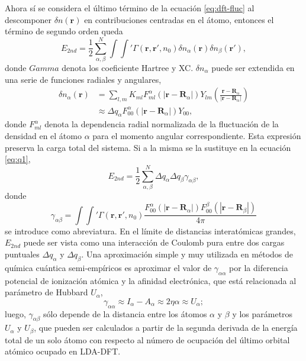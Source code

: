 \begin{enumerate}
        Ahora sí se considera el último término de la ecuación \ref{eq:dft-fluc}
        al descomponer $\delta n(\mathbf{r})$ en contribuciones centradas en el
        átomo, entonces el término de segundo orden queda
        \begin{equation}\label{eq:q1}
        E_{2nd} = \frac{1}{2} \sum_{\alpha, \beta}^N \int \int' \Gamma(\mathbf{r}, \mathbf{r}', n_0) \delta n_{\alpha}(\mathbf{r}) \delta n_{\beta}(\mathbf{r}'),
        \end{equation}
        donde $Gamma$ denota los coeficiente Hartree y XC. $\delta n_{\alpha}$
        puede ser extendida en una serie de funciones radiales y angulares,
        \begin{equation*}
            \begin{aligned}
                \delta n_{\alpha}(\mathbf{r}) &= \sum_{l,m} K_{ml} F_{ml}^{\alpha}(|\mathbf{r} - \mathbf{R}_{\alpha}|) Y_{lm} \left(\frac{\mathbf{r}-\mathbf{R}_{\alpha}}{|\mathbf{r}-\mathbf{R}_{\alpha}|}\right) \\
                &\approx \Delta q_{\alpha} F_{00}^{\alpha}(|\mathbf{r} - \mathbf{R}_{\alpha}|) Y_{00},
            \end{aligned}
        \end{equation*}
        donde $F_{ml}^{\alpha}$ denota la dependencia radial normalizada de la
        fluctuación de la densidad en el átomo $\alpha$ para el momento angular
        correspondiente. Esta expresión preserva la carga total del sistema.
        Si a la misma se la sustituye en la ecuación \ref{eq:q1},
        $$
        E_{2nd} = \frac{1}{2} \sum_{\alpha,\beta}^N \Delta q_{\alpha} \Delta q_{\beta} \gamma_{\alpha\beta},
        $$
        donde
        $$
        \gamma_{\alpha\beta} = \int \int' \Gamma(\mathbf{r},\mathbf{r}',n_0)\frac{F_{00}^{\alpha}(|\mathbf{r} - \mathbf{R}_{\alpha}|)F_{00}^{\beta}(|\mathbf{r} - \mathbf{R}_{\beta}|)}{4 \pi}
        $$
        se introduce como abreviatura. En el límite de distancias interatómicas
        grandes, $E_{2nd}$ puede ser vista como una interacción de Coulomb pura
        entre dos cargas puntuales $\Delta q_{\alpha}$ y $\Delta q_{\beta}$. Una
        aproximación simple y muy utilizada en métodos de química cuántica 
        semi-empíricos es aproximar el valor de $\gamma_{\alpha\alpha}$ por la 
        diferencia potencial de ionización atómica y la afinidad electrónica, que
        está relacionada al parámetro de Hubbard $U_{\alpha}$,
        $$
        \gamma_{\alpha\alpha} \approx I_{\alpha} - A_{\alpha} \approx 2 \eta \alpha \approx U_{\alpha};
        $$
        luego, $\gamma_{\alpha\beta}$ sólo depende de la distancia entre los 
        átomos $\alpha$ y $\beta$ y los parámetros $U_{\alpha}$ y $U_{\beta}$,
        que pueden ser calculados a partir de la segunda derivada de la energía
        total de un solo átomo con respecto al número de ocupación del último 
        orbital atómico ocupado en LDA-DFT.


\end{enumerate}
